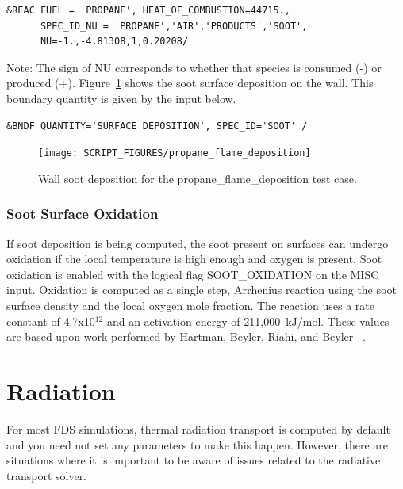 \documentclass[11pt]{book}
\begin{document}
\begin{lstlisting}
&REAC FUEL = 'PROPANE', HEAT_OF_COMBUSTION=44715.,
      SPEC_ID_NU = 'PROPANE','AIR','PRODUCTS','SOOT',
      NU=-1.,-4.81308,1,0.20208/
\end{lstlisting}

\noindent
Note: The sign of {\ct NU} corresponds to whether that species is consumed (-) or produced (+). Figure~\ref{soot_deposition} shows the soot surface deposition on the wall.  This boundary quantity is given by the input below.

\begin{lstlisting}
&BNDF QUANTITY='SURFACE DEPOSITION', SPEC_ID='SOOT' /
\end{lstlisting}

\begin{figure}[ht]
\centering
\texttt{[image: SCRIPT\_FIGURES/propane\_flame\_deposition]}
\caption[Wall soot deposition for the {\ct propane\_flame\_deposition} test case]{Wall soot deposition for the {\ct propane\_flame\_deposition} test case.}
\label{soot_deposition}
\end{figure}


\subsection{Soot Surface Oxidation}

If soot deposition is being computed, the soot present on surfaces can undergo oxidation if the local temperature is high enough and oxygen is present. Soot oxidation is enabled with the logical flag {\ct SOOT\_OXIDATION} on the {\ct MISC} input. Oxidation is computed as a single step, Arrhenius reaction using the soot surface density and the local oxygen mole fraction. The reaction uses a rate constant of 4.7x10$^{12}$ and an activation energy of 211,000~kJ/mol. These values are based upon work performed by Hartman, Beyler, Riahi, and Beyler ~\cite{Hartman_2012}.













\chapter{Radiation}

For most FDS simulations, thermal radiation transport is computed by default and you need not set any parameters to make this happen. However, there are situations where it is important to be aware of issues related to the radiative transport solver.
\end{document}
